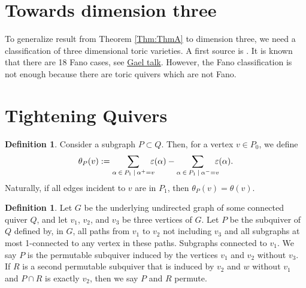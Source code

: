 \documentclass[11pt]{amsart}
\theoremstyle{plain}
\theoremstyle{definition}
\newtheorem{definition}[theorem]{Definition}
\begin{document}
\section{Towards dimension three}


To generalize result from Theorem \ref{Thm:ThmA} to dimension three, we need a classification of three dimensional toric varieties. A first source is  \cite{batyrev1991classification}. It is known that there are 18 Fano cases, see \href{https://kasprzyk.work/research/pdf/GAELTalk.pdf}{Gael talk}. However, the Fano classification is not enough because there are toric quivers which are not Fano. 

\newcommand{\R}{\mathbb{R}}
\newcommand{\rs}{\mkern-12mu}

\newpage
\section{Tightening Quivers}

\begin{definition} \label{subquiver_weight}
    Consider a subgraph $P \subset Q$. Then, for a vertex $v \in P_0$, we define 
    \[
    \theta_P(v) := \sum_{\alpha \:\in\: P_1 \:|\: \alpha^+ = v}\rs \varepsilon(\alpha) - \sum_{\alpha \:\in\: P_1 \:|\: \alpha^- = v}\rs \varepsilon(\alpha).
    \]
    Naturally, if all edges incident to $v$ are in $P_1$, then $\theta_P(v) = \theta(v)$.
\end{definition}

\begin{definition}
    Let $G$ be the underlying undirected graph of some connected quiver $Q$, and let $v_1$, $v_2$, and $v_3$ be three vertices of $G$. Let $P$ be the subquiver of $Q$ defined by, in $G$, all paths from $v_1$ to $v_2$ not including $v_3$ and all subgraphs at most 1-connected to any vertex in these paths. Subgraphs connected to $v_1$. We say $P$ is the permutable subquiver induced by the vertices $v_1$ and $v_2$ without $v_3$.
    \newline
    If $R$ is a second permutable subquiver that is induced by $v_2$ and $w$ without $v_1$ and $P \cap R$ is exactly $v_2$, then we say $P$ and $R$ permute.
\end{definition}
\end{document}
